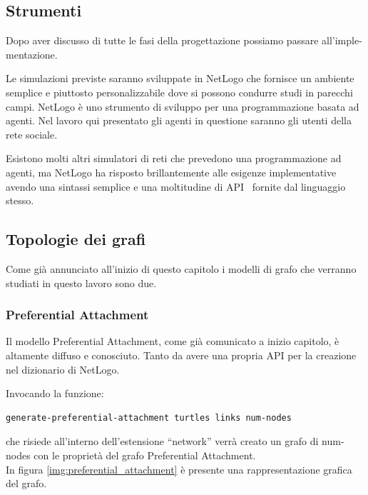 \vspace{5 mm}
\subsection{Strumenti}
\vspace{3 mm}


Dopo aver discusso di tutte le fasi della progettazione possiamo passare all'imple-mentazione.

Le simulazioni previste saranno sviluppate in NetLogo che fornisce un ambiente semplice e piuttosto 
personalizzabile dove si possono condurre studi in parecchi campi.
NetLogo è uno strumento di sviluppo per una programmazione basata ad agenti.
Nel lavoro qui presentato gli agenti in questione saranno gli utenti della rete sociale.

Esistono molti altri simulatori di reti che prevedono una programmazione ad agenti, ma NetLogo
ha risposto brillantemente alle esigenze implementative avendo una sintassi semplice e una moltitudine di
API~\cite{biblio:netlogo_dictionary} fornite dal linguaggio stesso.


\subsection{Topologie dei grafi}
\label{section:graph_topologies}
\vspace{3 mm}


Come già annunciato all'inizio di questo capitolo i modelli di grafo che verranno studiati in questo lavoro
sono due.


\subsubsection{Preferential Attachment}
Il modello Preferential Attachment, come già comunicato a inizio capitolo, è altamente diffuso e conosciuto.
Tanto da avere una propria API per la creazione nel dizionario di NetLogo.

Invocando la funzione:
\begin{lstlisting}[label=some-code, style=custom_code]
 generate-preferential-attachment turtles links num-nodes
\end{lstlisting}

che risiede all'interno dell'estensione ``network'' verrà creato un grafo di num-nodes con le proprietà 
del grafo Preferential Attachment.\\
In figura \ref{img:preferential_attachment} è presente una rappresentazione grafica del grafo.


